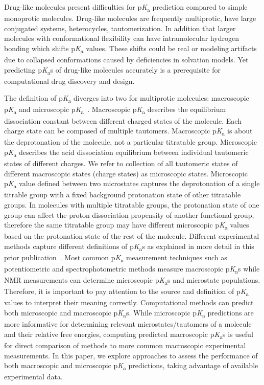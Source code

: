\documentclass[9pt,lineno,final]{elife}
\newcommand{\pKa}{p\textit{K}\textsubscript{a}}
\begin{document}
Drug-like molecules present difficulties for \pKa{} prediction compared to simple monoprotic molecules. 
Drug-like molecules are frequently multiprotic, have large conjugated systems, heterocycles, tautomerization. In addition that larger molecules with conformational flexibility can have intramolecular hydrogen bonding which shifts \pKa{} values. These shifts could be real or modeling artifacts due to collapsed conformations caused by deficiencies in solvation models. Yet predicting \pKa{}s of drug-like molecules accurately is a prerequisite for computational drug discovery and design.

The definition of \pKa{} diverges into two for multiprotic molecules: macroscopic \pKa{} and microscopic \pKa{}~\citep{Darvey:1995:Biochem.Educ., Bodner:1986:J.Chem.Educ., Murray:1995:Anal.Chem.}. 
Macroscopic \pKa{} describes the equilibrium dissociation constant between different charged states of the molecule. 
Each charge state can be composed of multiple tautomers. Macroscopic \pKa{} is about the deprotonation of the molecule, not a particular titratable group. 
Microscopic \pKa{} describes the acid dissociation equilibrium between individual tautomeric states of different charges. 
We refer to collection of all tautomeric states of different macroscopic states (charge states) as microscopic states. 
Microscopic \pKa{} value defined between two microstates captures the deprotonation of a single titrable group with a fixed background protonation state of other titratable groups. 
In molecules with multiple titratable groups, the protonation state of one group can affect the proton dissociation propensity of another functional group, therefore the same titratable group may have different microscopic \pKa{} values based on the protonation state of the rest of the molecule.
Different experimental methods capture different definitions of \pKa{}s as explained in more detail in this prior publication~\citep{Isik:2018:J.Comput.AidedMol.Des.}. 
Most common \pKa{} measurement techniques such as potentiometric and spectrophotometric methods measure macroscopic \pKa{}s while NMR measurements can determine microscopic \pKa{}s and microstate populations. 
Therefore, it is important to pay attention to the source and definition of \pKa{} values to interpret their meaning correctly. 
Computational methods can predict both microscopic and macroscopic \pKa{}s. While microscopic \pKa{} predictions are more informative for determining relevant microstates/tautomers of a molecule and their relative free energies, computing predicted macroscopic \pKa{}s is useful for direct comparison of methods to more common macroscopic experimental measurements. In this paper, we explore approaches to assess the performance of both macroscopic and microscopic \pKa{} predictions, taking advantage of available experimental data.
\end{document}
